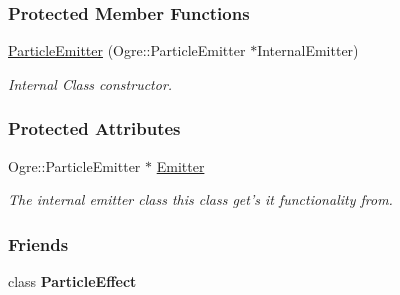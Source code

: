 \subsubsection*{Protected Member Functions}
\begin{DoxyCompactItemize}
\item 
\hypertarget{classMezzanine_1_1ParticleEmitter_ae21ea7430467e9c1f5264712ed7d7ac6}{
\hyperlink{classMezzanine_1_1ParticleEmitter_ae21ea7430467e9c1f5264712ed7d7ac6}{ParticleEmitter} (Ogre::ParticleEmitter $\ast$InternalEmitter)}
\label{classMezzanine_1_1ParticleEmitter_ae21ea7430467e9c1f5264712ed7d7ac6}

\begin{DoxyCompactList}\small\item\em Internal Class constructor. \item\end{DoxyCompactList}\end{DoxyCompactItemize}
\subsubsection*{Protected Attributes}
\begin{DoxyCompactItemize}
\item 
\hypertarget{classMezzanine_1_1ParticleEmitter_a2c22acd63a69c6960e8049d41294b9e9}{
Ogre::ParticleEmitter $\ast$ \hyperlink{classMezzanine_1_1ParticleEmitter_a2c22acd63a69c6960e8049d41294b9e9}{Emitter}}
\label{classMezzanine_1_1ParticleEmitter_a2c22acd63a69c6960e8049d41294b9e9}

\begin{DoxyCompactList}\small\item\em The internal emitter class this class get's it functionality from. \item\end{DoxyCompactList}\end{DoxyCompactItemize}
\subsubsection*{Friends}
\begin{DoxyCompactItemize}
\item 
\hypertarget{classMezzanine_1_1ParticleEmitter_af203df39e1cca172649874718059024b}{
class {\bfseries ParticleEffect}}
\label{classMezzanine_1_1ParticleEmitter_af203df39e1cca172649874718059024b}

\end{DoxyCompactItemize}



